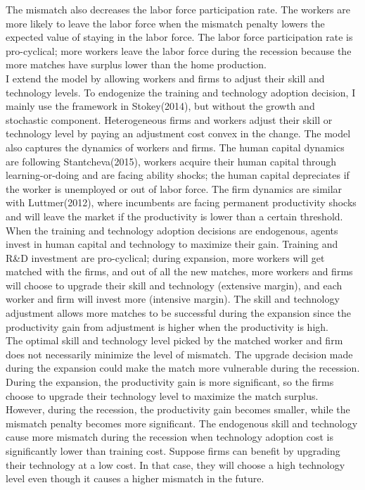 \documentclass[12pt]{article}
\newcommand{\1}{\mathbb{1}}
\begin{document}
The mismatch also decreases the labor force participation rate. The workers are more likely to leave the labor force when the mismatch penalty lowers the expected value of staying in the labor force. The labor force participation rate is pro-cyclical; more workers leave the labor force during the recession because the more matches have surplus lower than the home production. \\

I extend the model by allowing workers and firms to adjust their skill and technology levels. To endogenize the training and technology adoption decision, I mainly use the framework in Stokey(2014)\cite{Stokey2014}, but without the growth and stochastic component. Heterogeneous firms and workers adjust their skill or technology level by paying an adjustment cost convex in the change. The model also captures the dynamics of workers and firms. 
The human capital dynamics are following Stantcheva(2015)\cite{Stantcheva2015}, workers acquire their human capital through learning-or-doing and are facing ability shocks; the human capital depreciates if the worker is unemployed or out of labor force. 
The firm dynamics are similar with Luttmer(2012)\cite{Luttmer2012}, where incumbents are facing permanent productivity shocks and will leave the market if the productivity is lower than a certain threshold.  \\

When the training and technology adoption decisions are endogenous, agents invest in human capital and technology to maximize their gain. Training and R\&D investment are pro-cyclical; during expansion, more workers will get matched with the firms, and out of all the new matches, more workers and firms will choose to upgrade their skill and technology (extensive margin), and each worker and firm will invest more (intensive margin). The skill and technology adjustment allows more matches to be successful during the expansion since the productivity gain from adjustment is higher when the productivity is high. \\


The optimal skill and technology level picked by the matched worker and firm does not necessarily minimize the level of mismatch. The upgrade decision made during the expansion could make the match more vulnerable during the recession. During the expansion, the productivity gain is more significant, so the firms choose to upgrade their technology level to maximize the match surplus. However, during the recession, the productivity gain becomes smaller, while the mismatch penalty becomes more significant. The endogenous skill and technology cause more mismatch during the recession when technology adoption cost is significantly lower than training cost. Suppose firms can benefit by upgrading their technology at a low cost. In that case, they will choose a high technology level even though it causes a higher mismatch in the future.  \\
\end{document}
